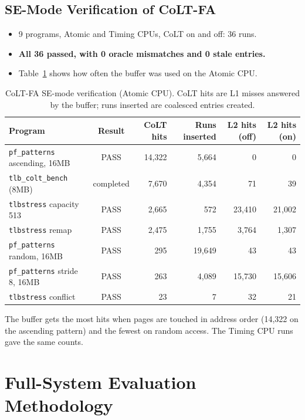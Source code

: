 \subsection{SE-Mode Verification of CoLT-FA}
\label{sec:colt_se}
\begin{itemize}
    \item 9 programs, Atomic and Timing CPUs, CoLT on and off: 36 runs.
    \item \textbf{All 36 passed, with 0 oracle mismatches and 0 stale entries.}
    \item Table~\ref{tab:colt_se} shows how often the buffer was used on the Atomic CPU.
\end{itemize}

\begin{table}[H]
\centering
\small
\caption{CoLT-FA SE-mode verification (Atomic CPU). CoLT hits are L1 misses answered by the buffer; runs inserted are coalesced entries created.}
\label{tab:colt_se}
\begin{tabular}{l c r r r r}
\toprule
\textbf{Program} & \textbf{Result} & \textbf{CoLT hits} & \textbf{Runs inserted} & \textbf{L2 hits (off)} & \textbf{L2 hits (on)} \\
\midrule
\texttt{pf\_patterns} ascending, 16MB & PASS & 14,322 & 5,664 & 0 & 0 \\
\texttt{tlb\_colt\_bench} (8MB) & completed & 7,670 & 4,354 & 71 & 39 \\
\texttt{tlbstress} capacity 513 & PASS & 2,665 & 572 & 23,410 & 21,002 \\
\texttt{tlbstress} remap & PASS & 2,475 & 1,755 & 3,764 & 1,307 \\
\texttt{pf\_patterns} random, 16MB & PASS & 295 & 19,649 & 43 & 43 \\
\texttt{pf\_patterns} stride 8, 16MB & PASS & 263 & 4,089 & 15,730 & 15,606 \\
\texttt{tlbstress} conflict & PASS & 23 & 7 & 32 & 21 \\
\bottomrule
\end{tabular}
\end{table}

\noindent The buffer gets the most hits when pages are touched in address order (14,322 on the ascending pattern) and the fewest on random access. The Timing CPU runs gave the same counts.

\section{Full-System Evaluation Methodology}
\label{sec:fs_method}

